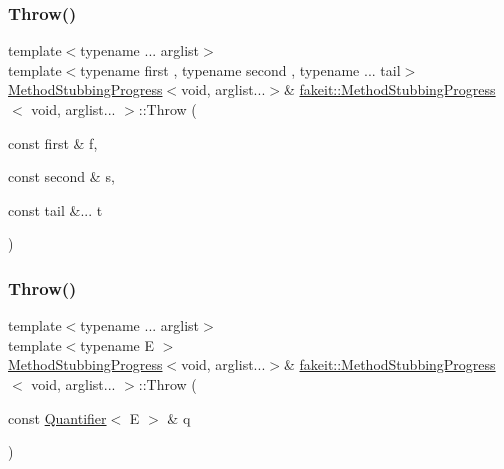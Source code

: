 \mbox{\label{structfakeit_1_1MethodStubbingProgress_3_01void_00_01arglist_8_8_8_01_4_a2db97b61a39cc6cecc379f6d51234c8a}} 
\subsubsection{\texorpdfstring{Throw()}{Throw()}\hspace{0.1cm}{\footnotesize\ttfamily [8/27]}}
{\footnotesize\ttfamily template$<$typename ... arglist$>$ \\
template$<$typename first , typename second , typename ... tail$>$ \\
\mbox{\hyperlink{structfakeit_1_1MethodStubbingProgress}{Method\+Stubbing\+Progress}}$<$void, arglist...$>$\& \mbox{\hyperlink{structfakeit_1_1MethodStubbingProgress}{fakeit\+::\+Method\+Stubbing\+Progress}}$<$ void, arglist... $>$\+::Throw (\begin{DoxyParamCaption}\item[{const first \&}]{f,  }\item[{const second \&}]{s,  }\item[{const tail \&...}]{t }\end{DoxyParamCaption})\hspace{0.3cm}{\ttfamily [inline]}}

\mbox{\label{structfakeit_1_1MethodStubbingProgress_3_01void_00_01arglist_8_8_8_01_4_a9eb6f25dd382ef939b775345205f42c1}} 
\subsubsection{\texorpdfstring{Throw()}{Throw()}\hspace{0.1cm}{\footnotesize\ttfamily [9/27]}}
{\footnotesize\ttfamily template$<$typename ... arglist$>$ \\
template$<$typename E $>$ \\
\mbox{\hyperlink{structfakeit_1_1MethodStubbingProgress}{Method\+Stubbing\+Progress}}$<$void, arglist...$>$\& \mbox{\hyperlink{structfakeit_1_1MethodStubbingProgress}{fakeit\+::\+Method\+Stubbing\+Progress}}$<$ void, arglist... $>$\+::Throw (\begin{DoxyParamCaption}\item[{const \mbox{\hyperlink{structfakeit_1_1Quantifier}{Quantifier}}$<$ E $>$ \&}]{q }\end{DoxyParamCaption})\hspace{0.3cm}{\ttfamily [inline]}}


